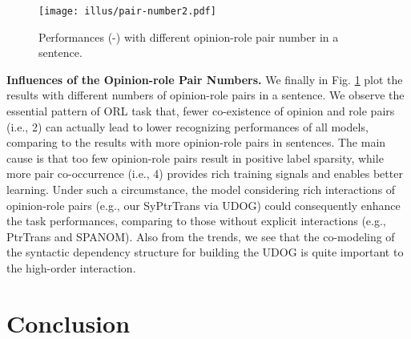 \documentclass[letterpaper]{article} \usepackage{aaai22}  \usepackage{times}  \usepackage{helvet}  \usepackage{courier}  \usepackage[hyphens]{url}  \usepackage{graphicx} \urlstyle{rm} \def\UrlFont{\rm}  \usepackage{natbib}  \usepackage{caption} \DeclareCaptionStyle{ruled}{labelfont=normalfont,labelsep=colon,strut=off} \frenchspacing  \setlength{\pdfpagewidth}{8.5in}  \setlength{\pdfpageheight}{11in}  \usepackage{algorithm}
\begin{document}
\begin{figure}[!t]
\centering
\texttt{[image: illus/pair-number2.pdf]}
\caption{
Performances (-) with different opinion-role pair number in a sentence.
}
\label{pair-number}
\end{figure}













\vspace{3pt}
\noindent\textbf{Influences of the Opinion-role Pair Numbers.}
We finally in Fig. \ref{pair-number} plot the results with different numbers of opinion-role pairs in a sentence.
We observe the essential pattern of ORL task that, fewer co-existence of opinion and role pairs (i.e., 2) can actually lead to lower recognizing performances of all models, comparing to the results with more opinion-role pairs in sentences.
The main cause is that too few opinion-role pairs result in positive label sparsity, while more pair co-occurrence (i.e., 4) provides rich training signals and enables better learning.
Under such a circumstance, the model considering rich interactions of opinion-role pairs (e.g., our SyPtrTrans via UDOG) could consequently enhance the task performances, comparing to those without explicit interactions (e.g., PtrTrans and S{\small PAN}OM).
Also from the trends, we see that the co-modeling of the syntactic dependency structure for building the UDOG is quite important to the high-order interaction.

















\section{Conclusion}
\end{document}
